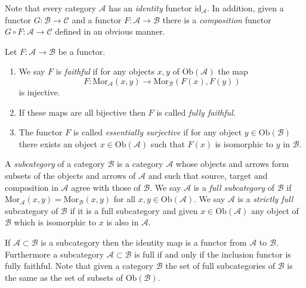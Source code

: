 \noindent
Note that every category $\mathcal{A}$ has an
{\it identity} functor $\text{id}_\mathcal{A}$.
In addition, given a functor $G : \mathcal{B} \to \mathcal{C}$
and a functor $F : \mathcal{A} \to \mathcal{B}$ there is
a {\it composition} functor $G \circ F : \mathcal{A} \to \mathcal{C}$
defined in an obvious manner.

\begin{definition}
\label{definition-faithful}
Let $F : \mathcal{A} \to \mathcal{B}$ be a functor.
\begin{enumerate}
\item We say $F$ is {\it faithful} if
for any objects $x, y$ of $\text{Ob}(\mathcal{A})$ the map
$$
F : \text{Mor}_\mathcal{A}(x, y) \to \text{Mor}_\mathcal{B}(F(x), F(y))
$$
is injective.
\item If these maps are all bijective then $F$ is called
{\it fully faithful}.
\item
The functor $F$ is called {\it essentially surjective} if for any
object $y \in \text{Ob}(\mathcal{B})$ there exists an object
$x \in \text{Ob}(\mathcal{A})$ such that $F(x)$ is isomorphic to $y$ in
$\mathcal{B}$.
\end{enumerate}
\end{definition}

\begin{definition}
\label{definition-subcategory}
A {\it subcategory} of a category $\mathcal{B}$ is
a category $\mathcal{A}$ whose objects and arrows
form subsets of the objects and arrows
of $\mathcal{A}$ and such that source, target
and composition in $\mathcal{A}$ agree with those
of $\mathcal{B}$. We say $\mathcal{A}$ is a
{\it full subcategory} of $\mathcal{B}$ if $\text{Mor}_{\mathcal{A}}(x, y)
= \text{Mor}_{\mathcal{B}}(x, y)$ for all $x, y \in \text{Ob}(\mathcal{A})$.
We say $\mathcal{A}$ is a {\it strictly full} subcategory of $\mathcal{B}$
if it is a full subcategory and given $x \in \text{Ob}(\mathcal{A})$ any
object of $\mathcal{B}$ which is isomorphic to $x$ is also in $\mathcal{A}$.
\end{definition}

\noindent
If $\mathcal{A} \subset \mathcal{B}$ is a subcategory then the
identity map is a functor from $\mathcal{A}$ to $\mathcal{B}$.
Furthermore a subcategory $\mathcal{A} \subset \mathcal{B}$
is full if and only if the inclusion functor is fully faithful.
Note that given a category $\mathcal{B}$ the set of full subcategories
of $\mathcal{B}$ is the same as the set of subsets of
$\text{Ob}(\mathcal{B})$.

